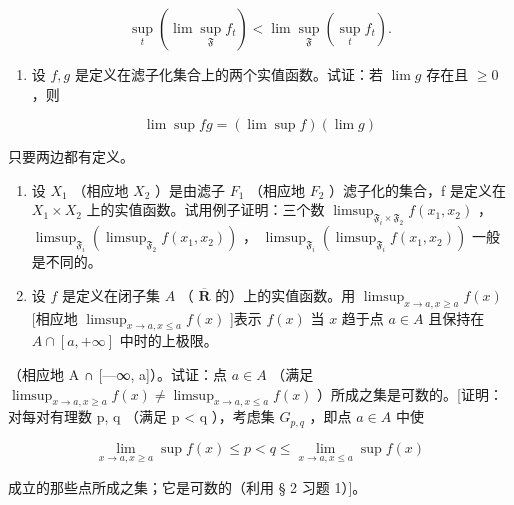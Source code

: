 \[
\sup _ {t} (\lim \sup _ {\mathfrak {F}} f _ {t}) <   \lim \sup _ {\mathfrak {F}} (\sup _ {t} f _ {t}).
\]

\begin{enumerate}
\def\labelenumi{\arabic{enumi})}
\setcounter{enumi}{4}
\tightlist
\item
设 \(f, g\) 是定义在滤子化集合上的两个实值函数。试证：若 \(\lim g\) 存在且 \(\geqslant 0\) ，则
\end{enumerate}

\[
\lim \sup f g = (\lim \sup f) (\lim g)
\]

只要两边都有定义。

\begin{enumerate}
\def\labelenumi{\arabic{enumi})}
\setcounter{enumi}{5}
\item
设 \(X_{1}\) （相应地 \(X_{2}\) ）是由滤子 \(F_{1}\) （相应地 \(F_{2}\) ）滤子化的集合，f 是定义在 \(X_{1} \times X_{2}\) 上的实值函数。试用例子证明：三个数 \(\limsup_{\mathfrak{F}_{i} \times \mathfrak{F}_{2}} f(x_{1}, x_{2})\) ， \(\limsup_{\mathfrak{F}_{i}} (\limsup_{\mathfrak{F}_{2}} f(x_{1}, x_{2}))\) ， \(\limsup_{\mathfrak{F}_{i}} (\limsup_{\mathfrak{F}_{i}} f(x_{1}, x_{2}))\) 一般是不同的。
\item
设 \(f\) 是定义在闭子集 \(A\) （ \(\overline{\mathbf{R}}\) 的）上的实值函数。用 \(\limsup_{x \to a, x \geqslant a} f(x)\) {[}相应地 \(\limsup_{x \to a, x \leqslant a} f(x)\) {]}表示 \(f(x)\) 当 \(x\) 趋于点 \(a \in A\) 且保持在 \(A \cap [a, +\infty]\) 中时的上极限。
\end{enumerate}


（相应地 A ∩ {[}---∞, a{]}）。试证：点 \(a \in A\) （满足 \(\limsup_{x \to a, x \geqslant a} f(x) \neq \limsup_{x \to a, x \leqslant a} f(x)\) ）所成之集是可数的。{[}证明：对每对有理数 p, q （满足 p \textless{} q ），考虑集 \(G_{p,q}\) ，即点 \(a \in A\) 中使

\[
\lim _ {x \rightarrow a, x \geqslant a} \sup f (x) \leqslant p <   q \leqslant \lim _ {x \rightarrow a, x \leqslant a} \sup f (x)
\]

成立的那些点所成之集；它是可数的（利用 § 2 习题 1）{]}。

